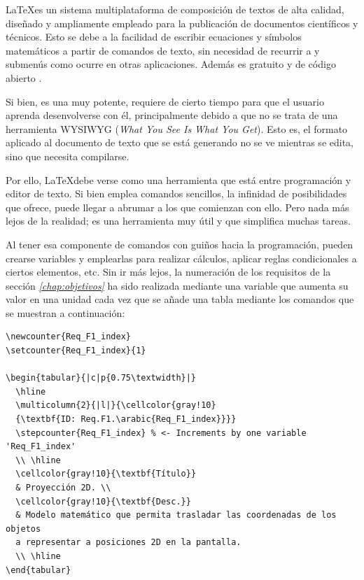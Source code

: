 \LaTeX es un sistema multiplataforma de composición de textos de alta calidad, diseñado y ampliamente empleado para la publicación de documentos científicos y técnicos. Esto se debe a la facilidad de escribir ecuaciones y símbolos matemáticos a partir de comandos de texto, sin necesidad de recurrir a y submenús como ocurre en otras aplicaciones. Además es gratuito y de código abierto \cite{latex}.

Si bien, es una muy potente, requiere de cierto tiempo para que el usuario aprenda desenvolverse con él, principalmente debido a que no se trata de una herramienta WYSIWYG (\textit{What You See Is What You Get}). Esto es, el formato aplicado al documento de texto que se está generando no se ve mientras se edita, sino que necesita compilarse. 

Por ello, \LaTeX debe verse como una herramienta que está entre programación y editor de texto. Si bien emplea comandos sencillos, la infinidad de posibilidades que ofrece, puede llegar a abrumar a los que comienzan con ello. Pero nada más lejos de la realidad; es una herramienta muy útil y que simplifica muchas tareas.

Al tener esa componente de comandos con guiños hacia la programación, pueden crearse variables y emplearlas para realizar cálculos, aplicar reglas condicionales a ciertos elementos, etc. Sin ir más lejos, la numeración de los requisitos de la sección \textit{\ref{chap:objetivos} } ha sido realizada mediante una variable que aumenta su valor en una unidad cada vez que se añade una tabla mediante los comandos que se muestran a continuación:

{\footnotesize
\begin{Verbatim}[frame=single]
\newcounter{Req_F1_index}
\setcounter{Req_F1_index}{1}

\begin{tabular}{|c|p{0.75\textwidth}|}			
  \hline
  \multicolumn{2}{|l|}{\cellcolor{gray!10}
  {\textbf{ID: Req.F1.\arabic{Req_F1_index}}}} 
  \stepcounter{Req_F1_index} % <- Increments by one variable 'Req_F1_index'
  \\ \hline		
  \cellcolor{gray!10}{\textbf{Título}} 
  & Proyección 2D. \\
  \cellcolor{gray!10}{\textbf{Desc.}} 
  & Modelo matemático que permita trasladar las coordenadas de los objetos 
  a representar a posiciones 2D en la pantalla. 
  \\ \hline		
\end{tabular}
\end{Verbatim}
}

